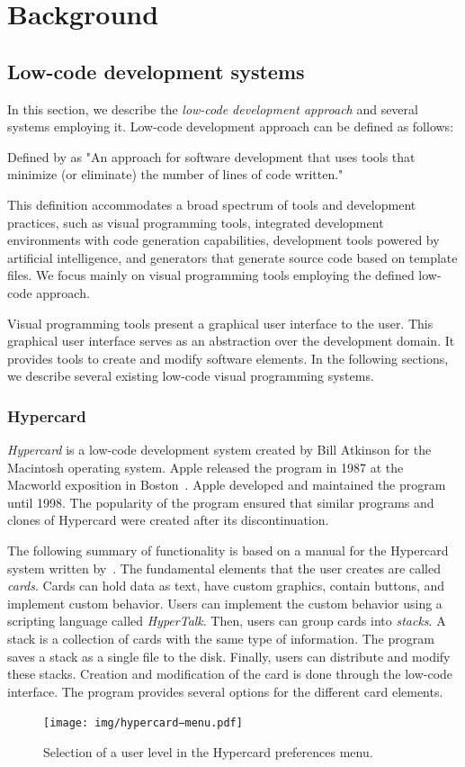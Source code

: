\chapter{Background}
\label{chap:background}

\section{Low-code development systems}
\label{sec:low-code}
In this section, we describe the \emph{low-code development approach} and several systems employing it.
Low-code development approach can be defined as follows:
\begin{defn}
	Defined by \citet{Pinho_Aguiar_Amaral_2023} as "An approach for software development that uses tools that minimize (or eliminate) the number of lines of code written."
\end{defn}
This definition accommodates a broad spectrum of tools and development practices, such as visual programming tools,
integrated development environments with code generation capabilities, development tools powered by artificial intelligence, and generators that generate source code based on template files.
We focus mainly on visual programming tools employing the defined low-code approach.

Visual programming tools present a graphical user interface to the user. This graphical user interface serves as an abstraction over
the development domain. It provides tools to create and modify software elements.
In the following sections, we describe several existing low-code visual programming systems.

\subsection{Hypercard}
\emph{Hypercard} is a low-code development system created by Bill Atkinson for the Macintosh operating system. Apple released the program in 1987 at the
Macworld exposition in Boston~\cite{hyper_release}. Apple developed and maintained the program until 1998.
The popularity of the program ensured that similar programs and clones of Hypercard were created after its discontinuation.

The following summary of functionality is based on a manual for the Hypercard system written by~\citet{goodman_hypertext}.
The fundamental elements that the user creates are called \emph{cards}. Cards can hold data as text, have custom graphics, contain buttons, and implement custom behavior.
Users can implement the custom behavior using a scripting language called \emph{HyperTalk}. Then, users can group cards into \emph{stacks}. A stack is a collection of cards with the same type of information.
The program saves a stack as a single file to the disk. Finally, users can distribute and modify these stacks.
Creation and modification of the card is done through the low-code interface. The program provides several options for the different card elements.
\begin{figure}[h]
	\centering
	\texttt{[image: img/hypercard−menu.pdf]}
	\caption{Selection of a user level in the Hypercard preferences menu.}
	\label{fig:f}
\end{figure}

